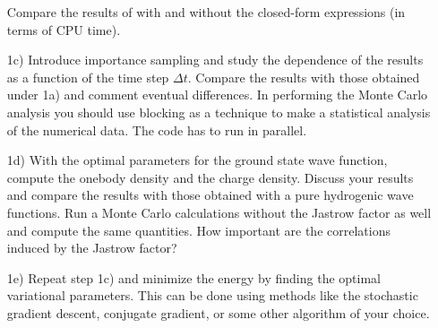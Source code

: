 \begin{enumerate}
Compare the results of with and without the closed-form expressions (in terms of CPU time).

\item[1c)] 
Introduce importance sampling and study the dependence of the results as a function of the time step $\Delta t$. Compare the results with those obtained under 1a) and comment eventual differences. In performing the Monte Carlo analysis you should use blocking\cite{FLY89} as a technique to make a statistical analysis of the numerical data. The code has to run in parallel.

\item[1d)]  
With the optimal parameters for the ground state wave function, compute the onebody density and the charge density. Discuss your results and compare the results with those obtained with a pure hydrogenic wave functions. Run a Monte Carlo calculations without the Jastrow factor as well and compute the same quantities. How important are the correlations induced by the Jastrow factor?

\item[1e)]  
Repeat step 1c) and minimize the energy by finding the optimal variational parameters. This can be done using methods like the stochastic gradient descent\cite{SGA}, conjugate gradient, or some other algorithm of your choice.

\end{enumerate}